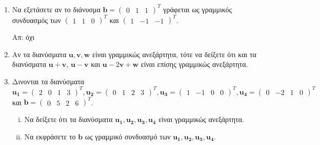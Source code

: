                         \begin{enumerate}
                            \item Να εξετάσετε αν το διάνυσμα $ \mathbf{b}= 
                                \begin{pmatrix}0 & 1 & 1\end{pmatrix}^{T}$ γράφεται ως γραμμικός 
                                συνδυασμός των $ 
                                \begin{pmatrix}1 & 1 & 0\end{pmatrix}^{T}$ και $ 
                                \begin{pmatrix}1 & -1 & -1\end{pmatrix}^{T} $.

                                \hfill Απ: όχι 

                            \item Αν τα διανύσματα $ \mathbf{u}, \mathbf{v}, \mathbf{w} $ είναι 
                                γραμμικώς ανεξάρτητα, τότε να δείξετε ότι και τα διανύσματα 
                                $ \mathbf{u}+ \mathbf{v} $, $ \mathbf{u}- \mathbf{v} $ και 
                                $ \mathbf{u}- 2 \mathbf{v}+ \mathbf{w} $ είναι επίσης γραμμικώς ανεξάρτητα.

                            \item Δινονται τα διανύσματα $ \mathbf{u_{1}} = 
                                \begin{pmatrix}2 & 0 & 1 & 3\end{pmatrix}^{T} , 
                                \mathbf{u_{2}} = \begin{pmatrix}0 & 1 & 2 & 3\end{pmatrix}^{T} , 
                                \mathbf{u_{3}} = \begin{pmatrix}1 & -1 & 0 & 0\end{pmatrix}^{T}, 
                                \mathbf{u_{4}} = \begin{pmatrix}0 & -2 & 1 & 0\end{pmatrix}^{T}$ και 
                                $ \mathbf{b} = \begin{pmatrix}0 & 5 & 2 & 6\end{pmatrix}^{T}$.
                                \begin{enumerate}[i)]
                                    \item Να δείξετε ότι τα διανύσματα $ \mathbf{u_{1}}, \mathbf{u_{2}}, 
                                        \mathbf{u_{3}}, \mathbf{u_{4}} $ είναι γραμμικώς ανεξάρτητα.
                                    \item Να εκφράσετε το $ \mathbf{b} $ ως γραμμικό συνδυασμό των 
                                        $ \mathbf{u_{1}}, \mathbf{u_{2}}, \mathbf{u_{3}}, \mathbf{u_{4}} $.
                                \end{enumerate}


\end{enumerate}
